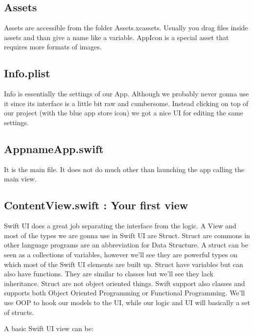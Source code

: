 \documentclass[]{article}
\begin{document}
\hypertarget{assets}{%
\subsection{Assets}\label{assets}}

Assets are accessible from the folder Assets.xcassets. Usually you drag
files inside assets and than give a name like a variable. AppIcon is a
special asset that requires more formats of images.

\hypertarget{info.plist}{%
\subsection{Info.plist}\label{info.plist}}

Info is essentially the settings of our App. Although we probably never
gonna use it since its interface is a little bit raw and cumbersome.
Instead clicking on top of our project (with the blue app store icon) we
got a nice UI for editing the same settings.

\hypertarget{appnameapp.swift}{%
\subsection{AppnameApp.swift}\label{appnameapp.swift}}

It is the main file. It does not do much other than launching the app
calling the main view.

\hypertarget{contentview.swift-your-first-view}{%
\subsection{ContentView.swift : Your first
view}\label{contentview.swift-your-first-view}}

Swift UI does a great job separating the interface from the logic. A
View and most of the types we are gonna use in Swift UI are Struct.
Struct are commons in other language programs are an abbreviation for
Data Structure. A struct can be seen as a collections of variables,
however we'll see they are powerful types on which most of the Swift UI
elements are built up. Struct have variables but can also have
functions. They are similar to classes but we'll see they lack
inheritance. Struct are not object oriented things. Swift support also
classes and supports both Object Oriented Programming or Functional
Programming. We'll use OOP to hook our models to the UI, while our logic
and UI will basically a set of structs.

A basic Swift UI view can be:
\end{document}
